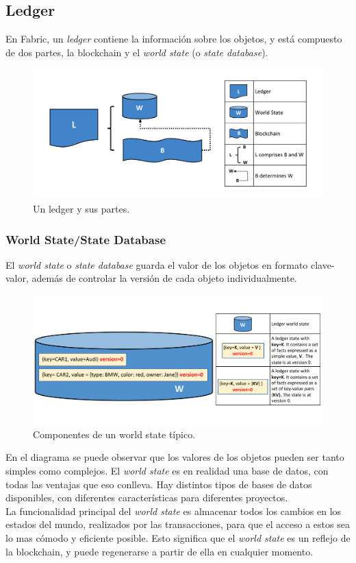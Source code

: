 \subsection{Ledger}
En Fabric, un \textit{ledger} contiene la información sobre los objetos, y está compuesto de dos partes, la blockchain y el \textit{world state} (o \textit{state database}).
\begin{figure}[H]
\centerline{\includegraphics[scale=0.35]{recursos/ledger-partes.png}}
\caption{Un ledger y sus partes.}
\label{ledger}
\end{figure}
\subsubsection{World State/State Database}
El \textit{world state} o \textit{state database} guarda el valor de los objetos en formato clave-valor, además de controlar la versión de cada objeto individualmente.
\begin{figure}[H]
\centerline{\includegraphics[scale=0.3]{recursos/world-state.png}}
\caption{Componentes de un world state típico.}
\label{world-state}
\end{figure}
En el diagrama se puede observar que los valores de los objetos pueden ser tanto simples como complejos.
El \textit{world state} es en realidad una base de datos, con todas las ventajas que eso conlleva. Hay distintos tipos de bases de datos disponibles, con diferentes características para diferentes proyectos.\\
La funcionalidad principal del \textit{world state} es almacenar todos los cambios en los estados del mundo, realizados por las transacciones, para que el acceso a estos sea lo mas cómodo y eficiente posible. Esto significa que el \textit{world state} es un reflejo de la blockchain, y puede regenerarse a partir de ella en cualquier momento.
\clearpage
